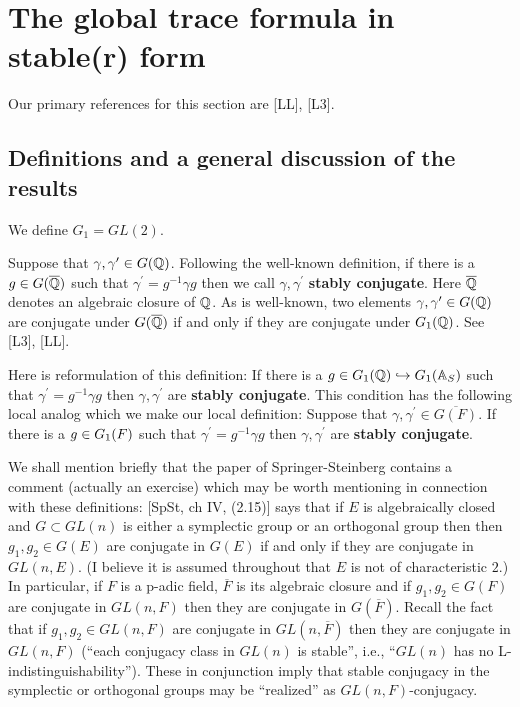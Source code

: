 
\section{The global trace formula in stable(r) form}

Our primary references for this section are [LL], [L3].
\subsection{Definitions and a general discussion of the results}

We define $G_1=GL(2)$. 

Suppose that $\gamma ,\gamma ^{\prime }\in G(\mathbb{Q} )$. Following the
well-known definition, if there is a $g\in G(\overline{\mathbb{Q} })$ such that $%
\gamma ^{\prime }=g^{-1}\gamma g$ then we call $\gamma ,\gamma ^{\prime }$ 
\textbf{stably conjugate}. Here $\overline{\mathbb{Q} }$ denotes an algebraic
closure of $\mathbb{Q} $. As is well-known, two elements $\gamma ,\gamma
^{\prime }\in G(\mathbb{Q} )$ are conjugate under
$G(\overline{\mathbb{Q} })$ if and
only if they are conjugate under $G_1(\mathbb{Q} )$. See [L3], [LL].

Here is reformulation of this definition: If there is a
$g\in G_1(\mathbb{Q} )\hookrightarrow G_1(\mathbb{A} _S)$ such
that $\gamma ^{\prime}=g^{-1}\gamma g$ then
$\gamma ,\gamma ^{\prime }$ are \textbf{stably conjugate}.
This condition has the following local analog which we make our
local definition:
Suppose that $\gamma ,\gamma ^{\prime }\in \overline{G(F)}$. If there
is a $g\in G_1(F\Bbb{)}$ such that 
$\gamma ^{\prime }=g^{-1}\gamma g$ then $\gamma ,\gamma ^{\prime }$ are 
\textbf{stably conjugate}.

\begin{remark}
We shall mention briefly that the paper of Springer-Steinberg
contains a comment (actually an exercise)
which may be worth mentioning in connection with
these definitions: [SpSt, ch IV, (2.15)] says that if $E$ is
algebraically closed and $G\subset GL(n)$ is either a symplectic
group or an orthogonal group then then $g_1,g_2\in G(E)$ are
conjugate in $G(E)$ if and only if they are conjugate in $GL(n,E)$.
(I believe it is assumed throughout that $E$ is not of characteristic $2$.)
In particular, if $F$ is a p-adic field, $\overline{F}$ is its
algebraic closure and if $g_1,g_2\in G(F)$ are conjugate in
$GL(n,F)$ then they are conjugate in $G(\overline{F})$.
Recall the fact that if $g_1,g_2\in GL(n,F)$
are conjugate in $GL(n,\overline{F})$
then they are conjugate in $GL(n,{F})$ (``each conjugacy class
in $GL(n)$ is stable'', i.e., ``$GL(n)$ has no L-indistinguishability'').
These in conjunction imply that stable conjugacy in the
symplectic or orthogonal groups may be ``realized'' as
$GL(n,F)$-conjugacy.
\end{remark}

